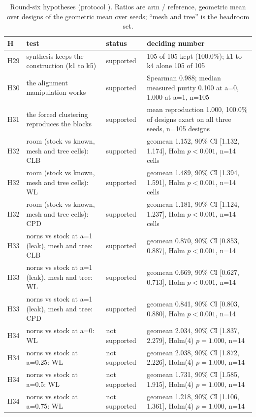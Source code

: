\begin{table}[t]
\caption{Round-six hypotheses (protocol ). Ratios are arm / reference, geometric mean over designs of the geometric mean over seeds; ``mesh and tree'' is the headroom set.}
\label{tab:r6status}
\centering\scriptsize
\begin{tabular}{@{}lp{5.2cm}p{2.4cm}p{8.4cm}@{}}
\toprule
H & test & status & deciding number \\
\midrule
H29 & synthesis keeps the construction (k1 to k5) & supported & 105 of 105 kept (100.0\%); k1 to k4 alone 105 of 105 \\
H30 & the alignment manipulation works & supported & Spearman 0.988; median measured purity 0.100 at a=0, 1.000 at a=1, n=105 \\
H31 & the forced clustering reproduces the blocks & supported & mean reproduction 1.000, 100.0\% of designs exact on all three seeds, n=105 designs \\
H32 & room (stock vs known, mesh and tree cells): CLB & supported & geomean 1.152, 90\% CI [1.132, 1.174], Holm $p<0.001$, n=14 cells \\
H32 & room (stock vs known, mesh and tree cells): WL & supported & geomean 1.489, 90\% CI [1.394, 1.591], Holm $p<0.001$, n=14 cells \\
H32 & room (stock vs known, mesh and tree cells): CPD & supported & geomean 1.181, 90\% CI [1.124, 1.237], Holm $p<0.001$, n=14 cells \\
H33 & norns vs stock at a=1 (leak), mesh and tree: CLB & supported & geomean 0.870, 90\% CI [0.853, 0.887], Holm $p<0.001$, n=14 \\
H33 & norns vs stock at a=1 (leak), mesh and tree: WL & supported & geomean 0.669, 90\% CI [0.627, 0.713], Holm $p<0.001$, n=14 \\
H33 & norns vs stock at a=1 (leak), mesh and tree: CPD & supported & geomean 0.841, 90\% CI [0.803, 0.880], Holm $p<0.001$, n=14 \\
H34 & norns vs stock at a=0: WL & not supported & geomean 2.034, 90\% CI [1.837, 2.279], Holm(4) $p=1.000$, n=14 \\
H34 & norns vs stock at a=0.25: WL & not supported & geomean 2.038, 90\% CI [1.872, 2.226], Holm(4) $p=1.000$, n=14 \\
H34 & norns vs stock at a=0.5: WL & not supported & geomean 1.731, 90\% CI [1.585, 1.915], Holm(4) $p=1.000$, n=14 \\
H34 & norns vs stock at a=0.75: WL & not supported & geomean 1.218, 90\% CI [1.106, 1.361], Holm(4) $p=1.000$, n=14 \\

\end{tabular}
\end{table}
